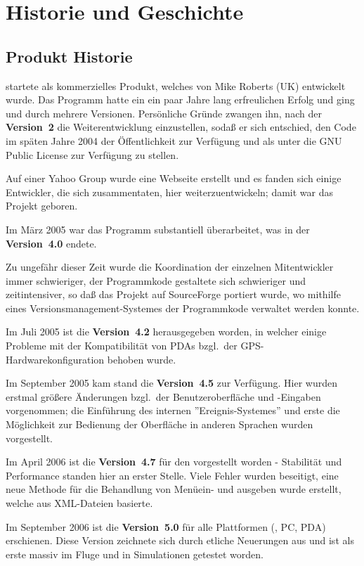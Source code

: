 \chapter{Historie und Geschichte}\label{cha:history-development}
\section{Produkt Historie}

\xc startete als kommerzielles Produkt, welches von Mike Roberts (UK) entwickelt wurde.
Das Programm hatte ein ein paar Jahre lang erfreulichen Erfolg und ging und durch mehrere Versionen.
Persönliche Gründe zwangen ihn, nach der  {\bf Version~2} die Weiterentwicklung einzustellen, sodaß
er sich entschied, den Code im späten Jahre 2004 der Öffentlichkeit zur Verfügung und  als
 unter die  GNU Public License  zur Verfügung zu stellen.

Auf einer Yahoo Group wurde eine Webseite erstellt und es fanden sich einige Entwickler, die sich zusammentaten,
hier weiterzuentwickeln; damit war das Projekt geboren.

Im März 2005 war das Programm substantiell überarbeitet, was in der {\bf Version~4.0} endete.

Zu ungefähr dieser Zeit wurde die Koordination der einzelnen Mitentwickler immer schwieriger, der Programmkode gestaltete sich
schwieriger und zeitintensiver, so daß das Projekt auf SourceForge portiert wurde, wo mithilfe eines Versionsmanagement-Systemes
der Programmkode  verwaltet werden konnte.

Im Juli 2005 ist die  {\bf Version~4.2} herausgegeben worden, in welcher einige Probleme mit der Kompatibilität von PDAs bzgl.\
der GPS-Hardwarekonfiguration behoben wurde.

Im September 2005 kam stand die {\bf Version~4.5} zur Verfügung. Hier wurden erstmal größere Änderungen bzgl.\ der Benutzeroberfläche
und -Eingaben vorgenommen; die Einführung  des internen ''Ereignis-Systemes'' und erste die Möglichkeit zur Bedienung der
Oberfläche in anderen Sprachen wurden vorgestellt.

Im April 2006 ist die {\bf Version~4.7} für den \al vorgestellt worden - Stabilität und Performance standen hier an erster Stelle.
Viele Fehler wurden beseitigt, eine neue Methode für die Behandlung von Menüein- und ausgeben wurde erstellt,
welche aus XML-Dateien basierte.

Im September 2006 ist die  {\bf Version~5.0} für alle Plattformen (\al, PC, PDA) erschienen.
Diese Version zeichnete sich durch etliche Neuerungen aus und ist als erste massiv im Fluge und in
Simulationen getestet  worden.

